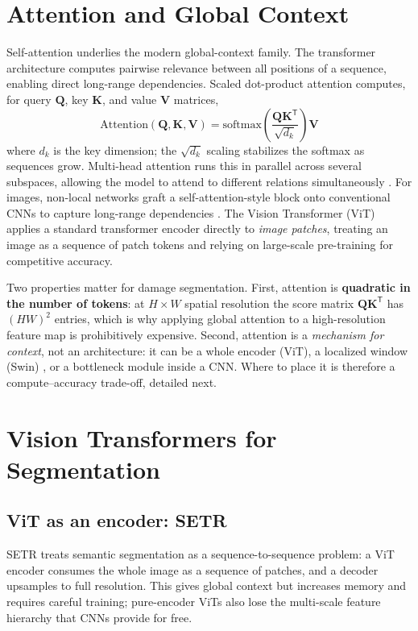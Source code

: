 \documentclass[conference]{IEEEtran}
\begin{document}
\section{Attention and Global Context}
\label{sec:attention}
Self-attention underlies the modern global-context family. The transformer
architecture \cite{attention2017} computes pairwise relevance between all
positions of a sequence, enabling direct long-range dependencies. Scaled
dot-product attention computes, for query $\mathbf{Q}$, key $\mathbf{K}$, and
value $\mathbf{V}$ matrices,
\begin{equation}
\mathrm{Attention}(\mathbf{Q},\mathbf{K},\mathbf{V})
= \mathrm{softmax}\!\left(\frac{\mathbf{Q}\mathbf{K}^{\mathsf T}}{\sqrt{d_k}}\right)\mathbf{V}
\label{eq:attention}
\end{equation}
where $d_k$ is the key dimension; the $\sqrt{d_k}$ scaling stabilizes the
softmax as sequences grow. Multi-head attention runs this in parallel across
several subspaces, allowing the model to attend to different relations
simultaneously \cite{attention2017}. For images, non-local networks graft a
self-attention-style block onto conventional CNNs to capture long-range
dependencies \cite{nonlocal2018}. The Vision Transformer (ViT) \cite{vit2021}
applies a standard transformer encoder directly to \emph{image patches},
treating an image as a sequence of patch tokens and relying on large-scale
pre-training for competitive accuracy.

Two properties matter for damage segmentation. First, attention is
\textbf{quadratic in the number of tokens}: at $H\times W$ spatial resolution the
score matrix $\mathbf{Q}\mathbf{K}^{\mathsf T}$ has $(HW)^2$ entries, which is
why applying global attention to a high-resolution feature map is
prohibitively expensive. Second, attention is a \emph{mechanism for context},
not an architecture: it can be a whole encoder (ViT), a localized window (Swin)
\cite{swin2021}, or a bottleneck module inside a CNN. Where to place it is
therefore a compute--accuracy trade-off, detailed next.

\section{Vision Transformers for Segmentation}
\subsection{ViT as an encoder: SETR}
SETR \cite{setr2021} treats semantic segmentation as a sequence-to-sequence
problem: a ViT encoder consumes the whole image as a sequence of patches, and a
decoder upsamples to full resolution. This gives global context but increases
memory and requires careful training; pure-encoder ViTs also lose the
multi-scale feature hierarchy that CNNs provide for free.
\end{document}

